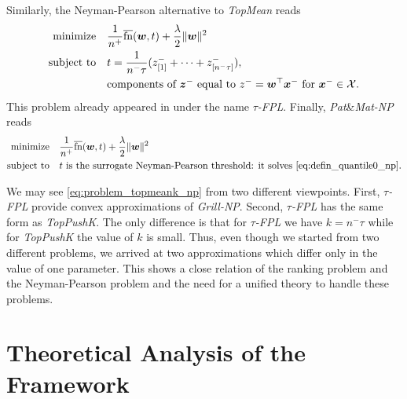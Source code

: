 \documentclass[]{interact}
\theoremstyle{plain}%
\theoremstyle{definition}
\theoremstyle{remark}
\newcommand{\norm}[1]{\|#1\|}
\newcommand{\toppushk}{\emph{TopPushK}\xspace}
\newcommand{\topmeank}{\emph{TopMean}\xspace}
\newcommand{\npA}{\emph{Grill-NP}\xspace}
\newcommand{\npB}{{\emph{Pat}\&\emph{Mat-NP}}\xspace}
\newcommand{\npC}{{\emph{$\tau$-FPL}}\xspace}
\newcommand{\fns}{\overline{\textnormal{fn}}}
\newcommand{\Xcal}{\mathcal{X}}
\begin{document}
Similarly, the Neyman-Pearson alternative to \topmeank reads
\begin{equation}\label{eq:problem_topmeank_np}
\aligned
{\rm minimize} & \quad\frac{1}{n^{+}}\fns(\bm w,t) + \frac\lambda2\norm{\bm w}^2 \\
\textnormal{subject to} & \quad t = \frac 1{n^-\tau}(z_{[1]}^- + \dots + z_{[n^-\tau]}^-), \\
& \quad \text{components of }\bm z^-\text{ equal to }z^-=\bm w^\top \bm x^-\text{ for }\bm x^- \in \Xcal.
\endaligned
\end{equation}
This problem already appeared in \cite{zhang2018tau} under the name \npC. Finally, \npB reads
\begin{equation}\label{eq:problem_patmat_np}
\aligned
{\rm minimize} & \quad \frac{1}{n^{+}}\fns(\bm w,t) + \frac\lambda2\norm{\bm w}^2\\
\textnormal{subject to} & \quad t\text{ is the surrogate Neyman-Pearson threshold: it solves }\eqref{eq:defin_quantile0_np}.
\endaligned
\end{equation}

We may see \eqref{eq:problem_topmeank_np} from two different viewpoints. First, \npC provide convex approximations of \npA. Second, \npC has the same form as \toppushk. The only difference is that for \npC we have $k=n^-\tau$ while for \toppushk the value of $k$ is small. Thus, even though we started from two different problems, we arrived at two approximations which differ only in the value of one parameter. This shows a close relation of the ranking problem and the Neyman-Pearson problem and the need for a unified theory to handle these problems.




\section{Theoretical Analysis of the Framework}\label{sec:theory}
\end{document}
